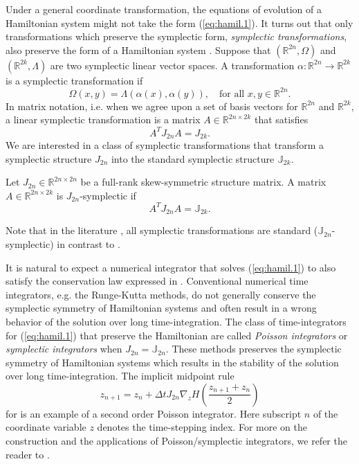 Under a general coordinate transformation, the equations of evolution of a Hamiltonian system might not take the form (\ref{eq:hamil.1}). It turns out that only transformations which preserve the symplectic form, \emph{symplectic transformations}, also preserve the form of a Hamiltonian system \cite{Hairer:1250576}. Suppose that $(\mathbb R^{2n},\Omega)$ and $(\mathbb R^{2k},\Lambda)$ are two symplectic linear vector spaces. A transformation $\alpha:\mathbb R^{2n}\to\mathbb R^{2k}$ is a symplectic transformation if
\begin{equation} \label{eq:hamil.3}
	\Omega(x,y) = \Lambda(\alpha(x),\alpha(y)), \quad \text{for all } x,y\in\mathbb R^{2n}.
\end{equation}
In matrix notation, i.e. when we agree upon a set of basis vectors for $\mathbb R^{2n}$ and $\mathbb R^{2k}$, a linear symplectic transformation is a matrix $A\in \mathbb R^{2n\times 2k}$ that satisfies
\begin{equation} \label{eq:hamil.4}
	A^T J_{2n} A = J_{2k}.
\end{equation}
We are interested in a class of symplectic transformations that transform a symplectic structure $J_{2n}$ into the standard symplectic structure $\mathbb J_{2k}$.
\begin{definition} \label{def:symp-mat}
Let $J_{2n}\in \mathbb R^{2n\times 2n}$ be a full-rank skew-symmetric structure matrix. A matrix $A\in\mathbb R^{2n\times 2k}$ is $J_{2n}$-symplectic if
\begin{equation} \label{eq:hamil.5}
A^T J_{2n} A = \mathbb{J}_{2k}.
\end{equation}
\end{definition}
Note that in the literature \cite{Marsden:2010:IMS:1965128,Hairer:1250576}, all symplectic transformations are standard ($\mathbb{J}_{2n}$-symplectic) in contrast to .

It is natural to expect a numerical integrator that solves (\ref{eq:hamil.1}) to also satisfy the conservation law expressed in  . Conventional numerical time integrators, e.g. the Runge-Kutta methods, do not generally conserve the symplectic symmetry of Hamiltonian systems and often result in a wrong  behavior of the solution over long time-integration. The class of time-integrators for (\ref{eq:hamil.1}) that preserve the Hamiltonian are called \emph{Poisson integrators} or \emph{symplectic integrators} when $J_{2n} = \mathbb J_{2n}$. These methods preserves the symplectic symmetry of Hamiltonian systems which results in the stability of the solution over long time-integration. The implicit midpoint rule
\begin{equation}
	z_{n+1} = z_{n} + \Delta t J_{2n} \nabla_z H \left( \frac{z_{n+1} + z_n}{2} \right)
\end{equation}
for  is an example of a second order Poisson integrator. Here subscript $n$ of the coordinate variable $z$ denotes the time-stepping index. For more on the construction and the applications of Poisson/symplectic integrators, we refer the reader to \cite{Hairer:1250576}. 
